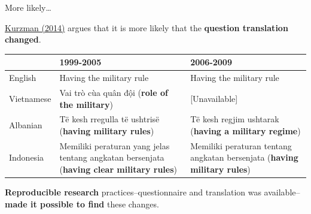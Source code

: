 \documentclass[10pt]{beamer}
\begin{document}
\begin{frame}{More likely\ldots}

    \href{https://www.washingtonpost.com/news/monkey-cage/wp/2014/09/02/world-values-lost-in-translation/}{Kurzman (2014)} argues that it is more likely that the \textbf{question translation changed}.
{\small{
    \begin{table}
        \begin{tabular}{l p{3.5cm} p{3.5cm}}
        \hline
        & 1999-2005 & 2006-2009\\
        \hline\hline
        English & Having the military rule & Having the military rule \\

        Vietnamese & Vai tr\`{o} c\`{u}a qu\^{a}n đội (\textbf{role of the military}) & [Unavailable] \\

        Albanian & T\"{e} kesh rregulla t\"{e} ushtris\"{e} (\textbf{having military rules}) & T\"{e} kesh regjim ushtarak (\textbf{having a military regime}) \\

        Indonesia & Memiliki peraturan yang jelas tentang angkatan bersenjata (\textbf{having clear military rules}) & Memiliki peraturan tentang angkatan bersenjata (\textbf{having military rules})\\

        \hline
        \end{tabular}
    \end{table}

}}

\end{frame}

\begin{frame}

    \begin{center}
        \textbf{Reproducible research} practices--questionnaire and translation was available--\textbf{made it possible to find} these changes.
    \end{center}

\end{frame}
\end{document}
